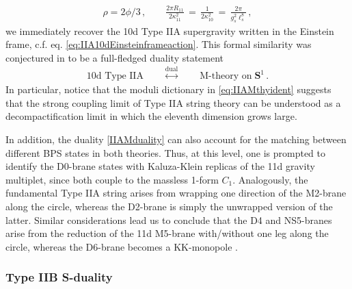 %
\begin{align}\label{eq:IIAMthyident}
    \rho=2 \phi/3\, ,\qquad \frac{2 \pi R_{11}}{2\kappa^2_{11}}\,=\,\frac{1}{2\kappa^2_{10}}\,=\, \frac{2 \pi}{g_s^2 \ell_s^8}\, , 
\end{align}
%
we immediately recover the 10d Type IIA supergravity written in the Einstein frame, c.f. eq. \eqref{eq:IIA10dEinsteinframeaction}. This formal similarity was conjectured in \cite{Witten:1995ex} to be a full-fledged duality statement
%
\begin{align} \label{IIAMduality}
\text{10d Type IIA} \qquad \stackrel{\text{dual}}{\longleftrightarrow} \qquad \text{M-theory on}\; \mathbf{S}^1\, . 
\end{align}
%
In particular, notice that the moduli dictionary in \eqref{eq:IIAMthyident} suggests that the strong coupling limit of Type IIA string theory can be understood as a decompactification limit in which the eleventh dimension grows large.  

In addition, the duality \eqref{IIAMduality} can also account for the matching between different BPS states in both theories. Thus, at this level, one is prompted to identify the D0-brane states with Kaluza-Klein replicas of the 11d gravity multiplet, since both couple to the massless 1-form $C_1$. Analogously, the fundamental Type IIA string arises from wrapping one direction of the M2-brane along the circle, whereas the D2-brane is simply the unwrapped version of the latter. Similar considerations lead us to conclude that the D4 and NS5-branes arise from the reduction of the 11d M5-brane with/without one leg along the circle, whereas the D6-brane becomes a KK-monopole \cite{Gross:1983hb,Sorkin:1983ns}.  

\subsubsection*{Type IIB S-duality}

